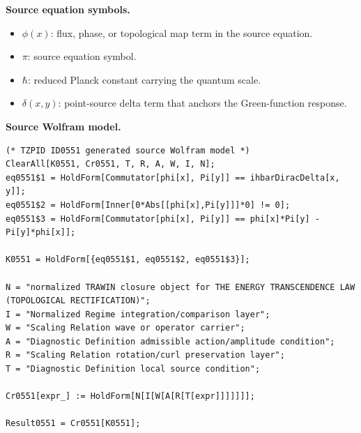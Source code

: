 \begin{minipage}[t]{0.49\linewidth}
\begingroup
\small
\raggedright
\textbf{Source equation symbols.}\par
\begin{itemize}[leftmargin=1.35em,itemsep=1pt,topsep=1pt,parsep=0pt]
    \item $\phi(x)$: flux, phase, or topological map term in the source equation.
    \item $\pi$: source equation symbol.
    \item $\hbar$: reduced Planck constant carrying the quantum scale.
    \item $\delta(x,y)$: point-source delta term that anchors the Green-function response.
\end{itemize}
\endgroup
\end{minipage}\hfill
\begin{minipage}[t]{0.47\linewidth}
\begingroup
\scriptsize
\raggedright
\textbf{Source Wolfram model.}\par
\begin{Verbatim}[fontsize=\tiny,breaklines=true,breakanywhere=true]
(* TZPID ID0551 generated source Wolfram model *)
ClearAll[K0551, Cr0551, T, R, A, W, I, N];
eq0551$1 = HoldForm[Commutator[phi[x], Pi[y]] == ihbarDiracDelta[x, y]];
eq0551$2 = HoldForm[Inner[0*Abs[[phi[x],Pi[y]]]*0] != 0];
eq0551$3 = HoldForm[Commutator[phi[x], Pi[y]] == phi[x]*Pi[y] - Pi[y]*phi[x]];

K0551 = HoldForm[{eq0551$1, eq0551$2, eq0551$3}];

N = "normalized TRAWIN closure object for THE ENERGY TRANSCENDENCE LAW (TOPOLOGICAL RECTIFICATION)";
I = "Normalized Regime integration/comparison layer";
W = "Scaling Relation wave or operator carrier";
A = "Diagnostic Definition admissible action/amplitude condition";
R = "Scaling Relation rotation/curl preservation layer";
T = "Diagnostic Definition local source condition";

Cr0551[expr_] := HoldForm[N[I[W[A[R[T[expr]]]]]]];

Result0551 = Cr0551[K0551];
\end{Verbatim}
\endgroup
\end{minipage}

